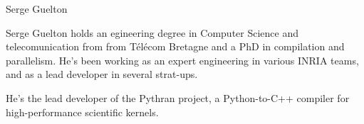 \begin{participant}[PM=12]{Serge Guelton}

    Serge Guelton holds an egineering degree in Computer Science and
    telecomunication from from Télécom Bretagne and a PhD in compilation and
    parallelism. He's been working as an expert engineering in various INRIA
    teams, and as a lead developer in several strat-ups.

    He's the lead developer of the Pythran project, a Python-to-C++ compiler
    for high-performance scientific kernels.

\end{participant}
